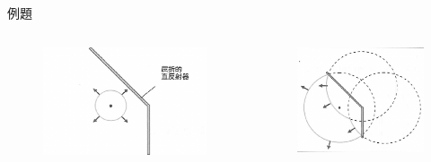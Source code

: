 \documentclass[13pt]{beamer}
\begin{document}
\begin{frame}{例題}
    \begin{columns}
        \begin{figure}
            \centering
            \includegraphics[width=1\linewidth]{images/Screenshot 2023-09-27 at 5.58.33 PM.png}
        \end{figure}
        \begin{figure}
            \centering
            \includegraphics[width=1\linewidth]{images/Screenshot 2023-09-27 at 5.58.44 PM.png}
        \end{figure}
    \end{columns}


\end{frame}
\end{document}
